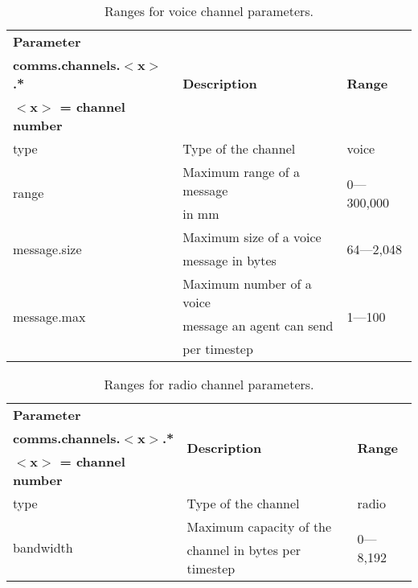 \documentclass{article}
\begin{document}
\begin{table}[htb]
\caption{Ranges for voice channel parameters.}
\label{tab:5}
\centering
\begin{tabular}{lll}
  \hline
  \textbf{Parameter}                & \multirow{3}{*}{\textbf{Description}} & \multirow{3}{*}{\textbf{Range}}\\
  \textbf{comms.channels.$<$x$>$.*} &                                       & \\
  \textbf{$<$x$>$ = channel number} &                                       & \\
  \hline
  type                              & Type of the channel                   & voice\\
  \hline
  \multirow{2}{*}{range}            & Maximum range of a message            & \multirow{2}{*}{0---300,000}\\
                                    & in mm                                 & \\
  \hline
  \multirow{2}{*}{message.size}     & Maximum size of a voice               & \multirow{2}{*}{64---2,048}\\
                                    & message in bytes                      & \\
  \hline
  \multirow{3}{*}{message.max}      & Maximum number of a voice             & \multirow{3}{*}{1---100}\\
                                    & message an agent can send             & \\
                                    & per timestep                          & \\
  \hline
\end{tabular}
\end{table}

\begin{table}[htb]
\caption{Ranges for radio channel parameters.}
\label{tab:6}
\centering
\begin{tabular}{lll}
  \hline
  \textbf{Parameter}                & \multirow{3}{*}{\textbf{Description}} & \multirow{3}{*}{\textbf{Range}}\\
  \textbf{comms.channels.$<$x$>$.*} &                                       & \\
  \textbf{$<$x$>$ = channel number} &                                       & \\
  \hline
  type                              & Type of the channel                   & radio\\
  \hline
  \multirow{2}{*}{bandwidth}        & Maximum capacity of the               & \multirow{2}{*}{0---8,192}\\
                                    & channel in bytes per timestep         & \\
  \hline
\end{tabular}
\end{table}
\end{document}
